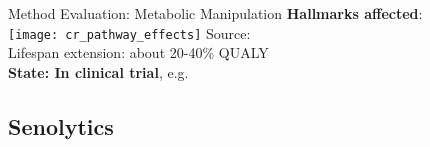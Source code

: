 \begin{frame}[c]{Method Evaluation: Metabolic Manipulation}
    \textbf{Hallmarks affected}: \\
    \texttt{[image: cr\_pathway\_effects]}
    \scriptsize
    Source: \cite{erbaba2020effects} \\
    \normalsize
    \pause
    Lifespan extension: about 20-40\% QUALY \cite{swindell2012dietary} \\
    \pause
    \textbf{State: In clinical trial}, e.g. \cite{TAMETarg47:online}
\end{frame}


\subsection{Senolytics}

